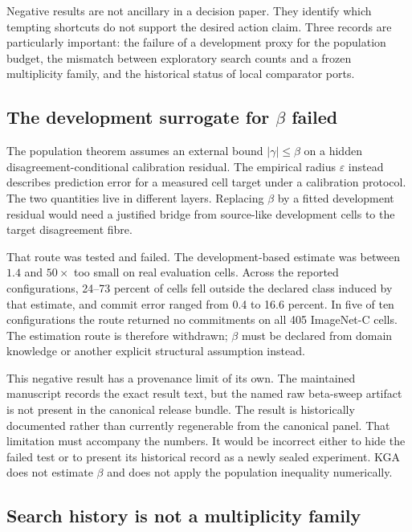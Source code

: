 Negative results are not ancillary in a decision paper.  They identify which tempting shortcuts do
not support the desired action claim.  Three records are particularly important: the failure of a
development proxy for the population budget, the mismatch between exploratory search counts and a
frozen multiplicity family, and the historical status of local comparator ports.

\subsection{The development surrogate for \texorpdfstring{$\beta$}{beta} failed}
\label{fr:sec-beta-failure}

The population theorem assumes an external bound $|\gamma|\le\beta$ on a hidden
disagreement-conditional calibration residual.  The empirical radius $\varepsilon$ instead
describes prediction error for a measured cell target under a calibration protocol.  The two
quantities live in different layers.  Replacing $\beta$ by a fitted development residual would
need a justified bridge from source-like development cells to the target disagreement fibre.

That route was tested and failed.  The development-based estimate was between $1.4$ and
$50\times$ too small on real evaluation cells.  Across the reported configurations, 24--73 percent
of cells fell outside the declared class induced by that estimate, and commit error ranged from
0.4 to 16.6 percent.  In five of ten configurations the route returned no commitments on all 405
ImageNet-C cells.  The estimation route is therefore withdrawn; $\beta$ must be declared from
domain knowledge or another explicit structural assumption instead.

This negative result has a provenance limit of its own.  The maintained manuscript records the
exact result text, but the named raw beta-sweep artifact is not present in the canonical release
bundle.  The result is historically documented rather than currently regenerable from the
canonical panel.  That limitation must accompany the numbers.  It would be incorrect either to
hide the failed test or to present its historical record as a newly sealed experiment.  KGA does
not estimate $\beta$ and does not apply the population inequality numerically.

\subsection{Search history is not a multiplicity family}
\label{fr:sec-search-history}

